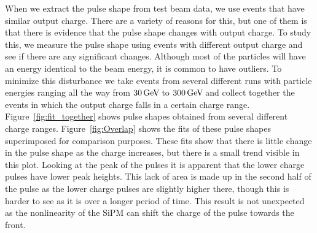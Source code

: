 When we extract the pulse shape from test beam data, we use events that have similar output charge. There are a variety of reasons for this, but one of them is that there is evidence that the pulse shape changes with output charge. To study this, we measure the pulse shape using events with different output charge and see if there are any significant changes. Although most of the particles will have an energy identical to the beam energy, it is common to have outliers. To minimize this disturbance we take events from several different runs with particle energies ranging all the way from $30 {\,\text{Ge\hspace{-.08em}V\hspace{-0.16em}}}$ to $300 {\,\text{Ge\hspace{-.08em}V\hspace{-0.16em}}}$ and collect together the events in which the output charge falls in a certain charge range. Figure~\ref{fig:fit_together} shows pulse shapes obtained from several different charge ranges. Figure~\ref{fig:Overlap} shows the fits of these pulse shapes superimposed for comparison purposes. These fits show that there is little change in the pulse shape as the charge increases, but there is a small trend visible in this plot. Looking at the peak of the pulses it is apparent that the lower charge pulses have lower peak heights. This lack of area is made up in the second half of the pulse as the lower charge pulses are slightly higher there, though this is harder to see as it is over a longer period of time. This result is not unexpected as the nonlinearity of the SiPM can shift the charge of the pulse towards the front. 


